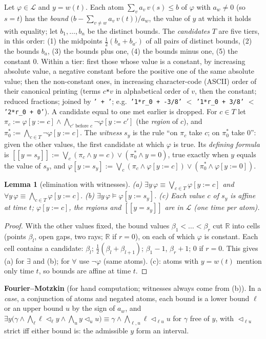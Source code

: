 \documentclass[10pt]{article}
\theoremstyle{tplain}\newtheorem{theorem}{Theorem}\newtheorem{lemma}[theorem]{Lemma}\newtheorem{proposition}[theorem]{Proposition}\newtheorem{corollary}[theorem]{Corollary}
\theoremstyle{tdef}\newtheorem{definition}[theorem]{Definition}
\newcommand{\df}[1]{[\![#1]\!]}
\begin{document}
Let $\varphi\in\mathcal L$ and $y=w(t)$. Each atom $\sum_va_v\,v(s)\le b$ of $\varphi$ with $a_w\ne0$ (so $s=t$) has the \emph{bound} $\big(b-\sum_{v\ne w}a_v\,v(t)\big)/a_w$, the value of $y$ at which it holds with equality; let $b_1,\dots,b_n$ be the distinct bounds. The \emph{candidates} $T$ are five tiers, in this order: (1) the midpoints $\frac12(b_a+b_{a'})$ of all pairs of distinct bounds, (2) the bounds $b_a$, (3) the bounds plus one, (4) the bounds minus one, (5) the constant $0$. Within a tier: first those whose value is a constant, by increasing absolute value, a negative constant before the positive one of the same absolute value; then the non-constant ones, in increasing character-code (ASCII) order of their canonical printing (terms $c$\texttt{*}$v$ in alphabetical order of $v$, then the constant; reduced fractions; joined by \texttt{' + '}; e.g.\ \texttt{'1*r\_0 + -3/8'} $<$ \texttt{'1*r\_0 + 3/8'} $<$ \texttt{'2*r\_0 + 0'}). A candidate equal to one met earlier is dropped. For $c\in T$ let $\pi_c:=\varphi[y:=c]\wedge\bigwedge_{c'\text{ before }c}\neg\varphi[y:=c']$ (the \emph{region} of $c$), and $\pi_0^\ast:=\bigwedge_{c\in T}\neg\varphi[y:=c]$. The \emph{witness} $s_y$ is the rule ``on $\pi_c$ take $c$; on $\pi_0^\ast$ take $0$'': given the other values, the first candidate at which $\varphi$ is true. Its \emph{defining formula} is $\df{y=s_y}:=\bigvee_{c}(\pi_c\wedge y=c)\vee(\pi^\ast_0\wedge y=0)$, true exactly when $y$ equals the value of $s_y$, and $\varphi[y:=s_y]:=\bigvee_c(\pi_c\wedge\varphi[y:=c])\vee(\pi^\ast_0\wedge\varphi[y:=0])$.
\begin{lemma}[elimination with witnesses]\label{lem:elim}
(a) $\exists y\,\varphi\equiv\bigvee_{c\in T}\varphi[y:=c]$ and $\forall y\,\varphi\equiv\bigwedge_{c\in T}\varphi[y:=c]$. (b) $\exists y\,\varphi\models\varphi[y:=s_y]$. (c) Each value $c$ of $s_y$ is affine at time $t$; $\varphi[y:=c]$, the regions and $\df{y=s_y}$ are in $\mathcal L$ (one time per atom).
\end{lemma}
\begin{proof}
With the other values fixed, the bound values $\beta_1<\dots<\beta_r$ cut $\mathbb R$ into cells (points $\beta_l$, open gaps, two rays; $\mathbb R$ if $r=0$), on each of which $\varphi$ is constant. Each cell contains a candidate: $\beta_l$; $\frac12(\beta_l+\beta_{l+1})$; $\beta_1-1$, $\beta_r+1$; $0$ if $r=0$. This gives (a) for $\exists$ and (b); for $\forall$ use $\neg\varphi$ (same atoms). (c): atoms with $y=w(t)$ mention only time $t$, so bounds are affine at time $t$.
\end{proof}
\textbf{Fourier--Motzkin} (for hand computation; witnesses always come from (b)). In a \emph{case}, a conjunction of atoms and negated atoms, each bound is a lower bound $\ell$ or an upper bound $u$ by the sign of $a_w$, and $\exists y\big(\gamma\wedge\bigwedge_\ell\ell\lhd_\ell y\wedge\bigwedge_uy\lhd_uu\big)\equiv\gamma\wedge\bigwedge_{\ell,u}\ell\lhd_{\ell u}u$ for $\gamma$ free of $y$, with $\lhd_{\ell u}$ strict iff either bound is: the admissible $y$ form an interval.
\end{document}
